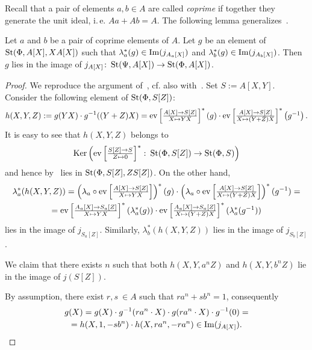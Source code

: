 Recall that a pair of elements $a, b \in A$ are called \textit{coprime} if together they generate the unit ideal, i.\,e. $Aa + Ab = A$.
The following lemma generalizes~\cite[Lemma~2.5]{Tu83}.
\begin{lemma}\label{lem:L25-2}
Let $a$ and $b$ be a pair of coprime elements of $A$.
Let $g$ be an element of $\St(\Phi, A[X], XA[X])$ such that
$\lambda_a^*(g) \in \Img(j_{A_a[X]})$ and $\lambda_b^*(g) \in \Img(j_{A_b[X]})$.
Then $g$ lies in the image of $j_{A[X]} \colon \St(\Psi, A[X]) \to \St(\Phi, A[X])$.
\end{lemma}
\begin{proof}
    We reproduce the argument of~\cite[Lemma~2.5]{Tu83}, cf. also with~\cite[Lemma~16]{S15}.
    Set $S := A[X, Y]$.
    Consider the following element of $\St(\Phi, S[Z])$:
    \[h(X, Y, Z) := g(YX) \cdot  g^{-1}((Y+Z) X) = \ev{A}{S[Z]}{YX}^* \left(g\right) \cdot \ev{A}{S[Z]}{(Y + Z)X}^*\left(g^{-1}\right).\]
    It is easy to see that $h(X, Y, Z)$ belongs to
    \[\Ker\left(\eval{Z}{S}{S}{0}^*\colon\St(\Phi, S[Z]) \rightarrow \St(\Phi, S)\right)\]
    and hence by~\cite[Lemma~8]{S15} lies in $\St(\Phi, S[Z], Z S[Z])$.
    On the other hand, \begin{multline*}
                           \lambda_{a}^*(h(X, Y, Z)) = \left(\lambda_a\circ \ev{A}{S[Z]}{Y X}\right)^*(g) \cdot \left(\lambda_a\circ \ev{A}{S[Z]}{(Y + Z)X}\right)^*(g^{-1}) = \\
                           = \ev{A_a}{S_a[Z]}{YX}^*(\lambda_{a}^*(g)) \cdot \ev{A_a}{S_a[Z]}{(Y + Z)X}^*(\lambda_{a}^*(g^{-1})) \end{multline*}
    lies in the image of $j_{S_a[Z]}$.
    Similarly, $\lambda_{b}^*(h(X, Y, Z))$ lies in the image of $j_{S_b[Z]}$.

    We claim that there exists $n$ such that both $h(X, Y, a^n Z)$ and $h(X, Y, b^n Z)$
    lie in the image of $j(S[Z])$.

    By assumption, there exist $r, s\ \in A$ such that $r a^n + s b^n = 1$, consequently
    \begin{multline*}
        g(X) = g(X)\cdot g^{-1}(ra^n\cdot X) \cdot g(ra^n\cdot X) \cdot g^{-1}(0) = \\
         = h(X, 1, -sb^n) \cdot h(X, ra^n, -ra^n) \in \mathrm{Im}(j_{A[X]}). \qedhere
    \end{multline*} \end{proof}

